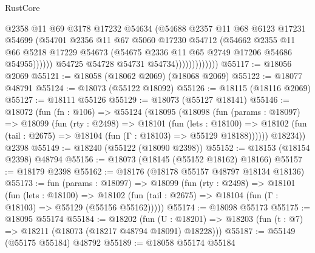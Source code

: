 \begin{lexlean}{RustCore}
\begin{coremodule}
                                  @2358
                                  @11
                                  @69
                                  @3178
                                  @17232
                                  @54634
                                  (@54688
                                    @2357
                                    @11
                                    @68
                                    @6123
                                    @17231
                                    @54699
                                    (@54701
                                      @2356
                                      @11
                                      @67
                                      @5060
                                      @17230
                                      @54712
                                      (@54662
                                        @2355
                                        @11
                                        @66
                                        @5218
                                        @17229
                                        @54673
                                        (@54675 @2336 @11 @65 @2749 @17206 @54686 @54955))))))
                              @54725
                              @54728
                              @54731
                              @54734)))))))))))))
@55117 := @18056 @2069
@55121 := @18058 (@18062 @2069) (@18068 @2069)
@55122 := @18077 @48791
@55124 := @18073 (@55122 @18092)
@55126 := @18115 (@18116 @2069)
@55127 := @18111 @55126
@55129 := @18073 (@55127 @18141)
@55146 := @18072
    (fun (fn : @106) =>
    @55124
      (@18095
        (@18098
          (fun (params : @18097) =>
          @18099
            (fun (rty : @2498) =>
            @18101
              (fun (lets : @18100) =>
              @18102 (fun (tail : @2675) => @18104 (fun (Γ : @18103) => @55129 @18188))))))
        @18234))
    @2398
@55149 := @18240 (@55122 (@18090 @2398))
@55152 := @18153 (@18154 @2398) @48794
@55156 := @18073 (@18145 (@55152 @18162) @18166)
@55157 := @18179 @2398
@55162 := @18176 (@18178 @55157 @48797 @18134 @18136)
@55173 := fun (params : @18097) =>
  @18099
    (fun (rty : @2498) =>
    @18101
      (fun (lets : @18100) =>
      @18102 (fun (tail : @2675) => @18104 (fun (Γ : @18103) => @55129 (@55156 @55162)))))
@55174 := @18098 @55173
@55175 := @18095 @55174
@55184 := @18202
    (fun (U : @18201) => @18203 (fun (t : @7) => @18211 (@18073 (@18217 @48794 @18091) @18228)))
@55187 := @55149 (@55175 @55184) @48792
@55189 := @18058 @55174 @55184

\end{coremodule}
\end{lexlean}
